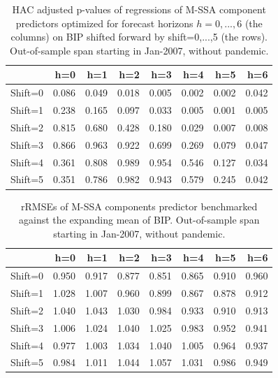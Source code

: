 \documentclass[a4paper]{article}
\begin{document}
\begin{table}[ht]
\centering
\begin{tabular}{rrrrrrrr}
  \hline
 & h=0 & h=1 & h=2 & h=3 & h=4 & h=5 & h=6 \\ 
  \hline
Shift=0 & 0.086 & 0.049 & 0.018 & 0.005 & 0.002 & 0.002 & 0.042 \\ 
  Shift=1 & 0.238 & 0.165 & 0.097 & 0.033 & 0.005 & 0.001 & 0.005 \\ 
  Shift=2 & 0.815 & 0.680 & 0.428 & 0.180 & 0.029 & 0.007 & 0.008 \\ 
  Shift=3 & 0.866 & 0.963 & 0.922 & 0.699 & 0.269 & 0.079 & 0.047 \\ 
  Shift=4 & 0.361 & 0.808 & 0.989 & 0.954 & 0.546 & 0.127 & 0.034 \\ 
  Shift=5 & 0.351 & 0.786 & 0.982 & 0.943 & 0.579 & 0.245 & 0.042 \\ 
   \hline
\end{tabular}
\caption{HAC adjusted p-values of regressions of M-SSA component predictors optimized for forecast horizons $h=0,...,6$  (the columns) on BIP shifted forward by shift=0,...,5 (the rows). Out-of-sample span starting in Jan-2007, without pandemic.} 
\label{p_val_wc5}
\end{table}%
\begin{table}[ht]
\centering
\begin{tabular}{rrrrrrrr}
  \hline
 & h=0 & h=1 & h=2 & h=3 & h=4 & h=5 & h=6 \\ 
  \hline
Shift=0 & 0.950 & 0.917 & 0.877 & 0.851 & 0.865 & 0.910 & 0.960 \\ 
  Shift=1 & 1.028 & 1.007 & 0.960 & 0.899 & 0.867 & 0.878 & 0.912 \\ 
  Shift=2 & 1.040 & 1.043 & 1.030 & 0.984 & 0.933 & 0.910 & 0.913 \\ 
  Shift=3 & 1.006 & 1.024 & 1.040 & 1.025 & 0.983 & 0.952 & 0.941 \\ 
  Shift=4 & 0.977 & 1.003 & 1.034 & 1.040 & 1.005 & 0.964 & 0.937 \\ 
  Shift=5 & 0.984 & 1.011 & 1.044 & 1.057 & 1.031 & 0.986 & 0.949 \\ 
   \hline
\end{tabular}
\caption{rRMSEs of M-SSA components predictor benchmarked against the expanding mean of BIP. Out-of-sample span starting in Jan-2007, without pandemic.} 
\label{rRMSE_mSSA_comp_mean6}
\end{table}%
\end{document}
